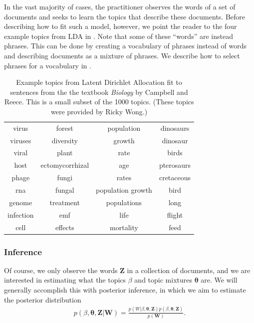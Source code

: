 In the vast majority of cases, the practitioner observes the words of
a set of documents and seeks to learn the topics that describe these
documents.  Before describing how to fit such a model, however, we
point the reader to the four example topics from LDA in
.  Note that some of these ``words'' are
instead phrases.  This can be done by creating a vocabulary of phrases
instead of words and describing documents as a mixture of phrases.  We
describe how to select phrases for a vocabulary in
.
\begin{table}
  \caption{Example topics from Latent Dirichlet Allocation fit to sentences from the the textbook \emph{Biology} by Campbell and Reece.  This is a small subset of the 1000 topics. (These topics were provided by Ricky Wong.)}
  \center  \begin{tabular}{|c|c|c|c|}
    \hline
    virus & forest & population & dinosaurs \\
    viruses & diversity & growth & dinosaur \\
    viral & plant & rate & birds \\
    host & ectomycorrhizal & age & pterosaurs \\
    phage & fungi & rates & cretaceous \\
    rna & fungal & population growth & bird \\
    genome & treatment & populations & long \\
    infection & emf & life & flight \\
    cell & effects & mortality & feed \\
    \hline
  \end{tabular}
  \label{fig:example_lda_topics}
\end{table}

\subsubsection{Inference}
Of course, we only observe the words $\bm Z$ in a collection of
documents, and we are interested in estimating what the topics $\beta$
and topic mixtures $\bm \theta$ are.  We will generally accomplish this
with posterior inference, in which we aim to estimate the posterior
distribution
\begin{align}
  p(\beta, \bm \theta, \bm Z | \bm W) = \frac{p(W | \beta, \bm \theta, \bm Z) p(\beta, \bm \theta, \bm Z)}{p(\bm W)}.
\end{align}

